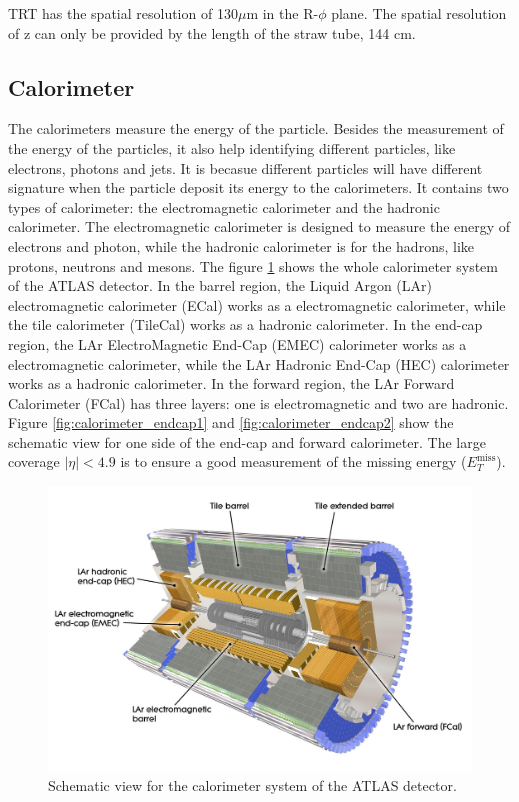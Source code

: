 TRT has the spatial resolution of 130$\mu$m in the R-$\phi$ plane.
The spatial resolution of z can only be provided by the length of the straw tube, 144 cm.

\subsection{Calorimeter}
The calorimeters measure the energy of the particle.
Besides the measurement of the energy of the particles, it also help identifying different particles, like electrons, photons and jets.
It is becasue different particles will have different signature when the particle deposit its energy to the calorimeters.
It contains two types of calorimeter: the electromagnetic calorimeter and the hadronic calorimeter.
The electromagnetic calorimeter is designed to measure the energy of electrons and photon, while the hadronic calorimeter is for the hadrons, like protons, neutrons and mesons.
The figure \ref{fig:calorimeter_whole} shows the whole calorimeter system of the ATLAS detector.
In the barrel region, the Liquid Argon (LAr) electromagnetic calorimeter (ECal) works as a electromagnetic calorimeter, while the tile calorimeter (TileCal) works as a hadronic calorimeter.
In the end-cap region, the LAr ElectroMagnetic End-Cap (EMEC) calorimeter works as a electromagnetic calorimeter, while the LAr Hadronic End-Cap (HEC) calorimeter works as a hadronic calorimeter.
In the forward region, the LAr Forward Calorimeter (FCal) has three layers: one is electromagnetic and two are hadronic.
Figure \ref{fig:calorimeter_endcap1} and \ref{fig:calorimeter_endcap2} show the schematic view for one side of the end-cap and forward calorimeter.
The large coverage $|\eta| < 4.9$ is to ensure a good measurement of the missing energy ($E_T^{\text{miss}}$).

\begin{figure}
\centering
\includegraphics[width=\textwidth]{data/photo/detector/calorimeter_whole.jpg}
\caption{Schematic view for the calorimeter system of the ATLAS detector. \cite{calorimeter_whole}}
\label{fig:calorimeter_whole}
\end{figure}


